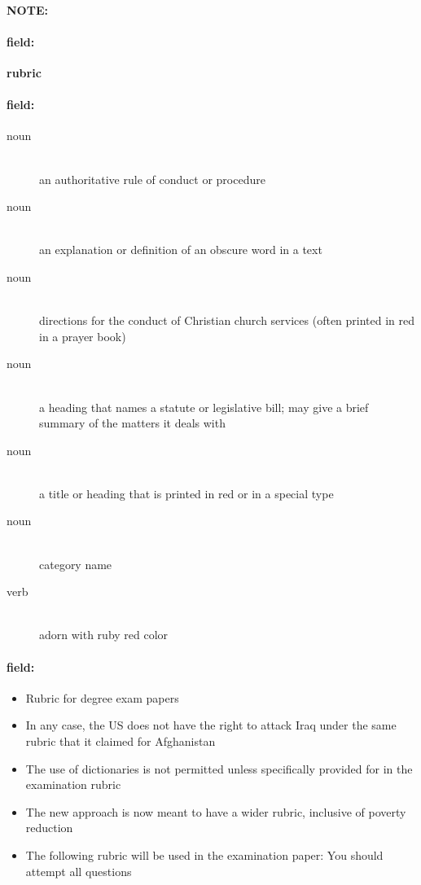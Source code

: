 \documentclass[12pt]{article}
\newenvironment{note}{\paragraph{NOTE:}}{}
\newenvironment{field}{\paragraph{field:}}{}
\begin{document}
\begin{note}
\begin{field}
\textbf{\large rubric}
\end{field}


\begin{field}
\begin{description}
\item[noun] \hfill \\ 
an authoritative rule of conduct or procedure

\item[noun] \hfill \\ 
an explanation or definition of an obscure word in a text

\item[noun] \hfill \\ 
directions for the conduct of Christian church services (often printed in red in a prayer book)

\item[noun] \hfill \\ 
a heading that names a statute or legislative bill; may give a brief summary of the matters it deals with

\item[noun] \hfill \\ 
a title or heading that is printed in red or in a special type

\item[noun] \hfill \\ 
category name

\item[verb] \hfill \\ 
adorn with ruby red color

\end{description}
\end{field}

\begin{field}
\begin{itemize}
\item Rubric for degree exam papers
\item In any case, the US does not have the right to attack Iraq under the same rubric that it claimed for Afghanistan
\item The use of dictionaries is not permitted unless specifically provided for in the examination rubric
\item The new approach is now meant to have a wider rubric, inclusive of poverty reduction
\item The following rubric will be used in the examination paper: You should attempt all questions
\end{itemize}
\end{field}
\end{note}
\end{document}
